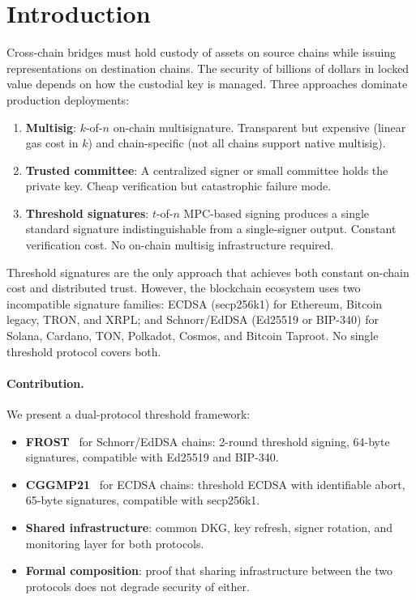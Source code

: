 \section{Introduction}

\label{sec:intro}

Cross-chain bridges must hold custody of assets on source chains while issuing
representations on destination chains. The security of billions of dollars in locked
value depends on how the custodial key is managed. Three approaches dominate
production deployments:

\begin{enumerate}[nosep]
  \item \textbf{Multisig}: $k$-of-$n$ on-chain multisignature. Transparent but
    expensive (linear gas cost in $k$) and chain-specific (not all chains support
    native multisig).
  \item \textbf{Trusted committee}: A centralized signer or small committee holds
    the private key. Cheap verification but catastrophic failure mode.
  \item \textbf{Threshold signatures}: $t$-of-$n$ MPC-based signing produces a
    single standard signature indistinguishable from a single-signer output.
    Constant verification cost. No on-chain multisig infrastructure required.
\end{enumerate}

Threshold signatures are the only approach that achieves both constant on-chain cost
and distributed trust. However, the blockchain ecosystem uses two incompatible
signature families: ECDSA (secp256k1) for Ethereum, Bitcoin legacy, TRON, and XRPL;
and Schnorr/EdDSA (Ed25519 or BIP-340) for Solana, Cardano, TON, Polkadot, Cosmos,
and Bitcoin Taproot. No single threshold protocol covers both.

\paragraph{Contribution.} We present a dual-protocol threshold framework:

\begin{itemize}[nosep]
  \item \textbf{FROST}~\cite{komlo2020frost} for Schnorr/EdDSA chains: 2-round
    threshold signing, 64-byte signatures, compatible with Ed25519 and BIP-340.
  \item \textbf{CGGMP21}~\cite{canetti2021cggmp} for ECDSA chains: threshold ECDSA
    with identifiable abort, 65-byte signatures, compatible with secp256k1.
  \item \textbf{Shared infrastructure}: common DKG, key refresh, signer rotation,
    and monitoring layer for both protocols.
  \item \textbf{Formal composition}: proof that sharing infrastructure between the
    two protocols does not degrade security of either.
\end{itemize}

